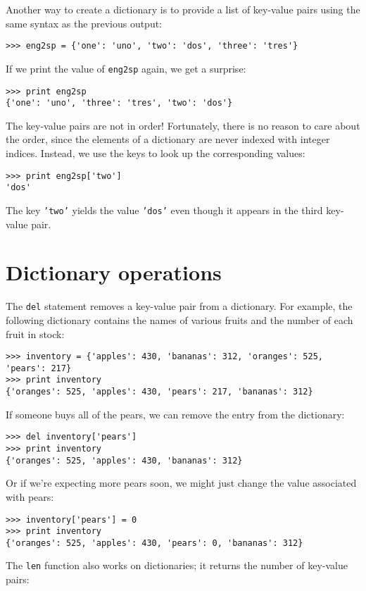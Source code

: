 Another way to create a dictionary is to provide a list of key-value
pairs using the same syntax as the previous output:

\beforeverb
\begin{verbatim}
>>> eng2sp = {'one': 'uno', 'two': 'dos', 'three': 'tres'}
\end{verbatim}
\afterverb
%
If we print the value of {\tt eng2sp} again, we get a surprise:

\beforeverb
\begin{verbatim}
>>> print eng2sp
{'one': 'uno', 'three': 'tres', 'two': 'dos'}
\end{verbatim}
\afterverb
%
The key-value pairs are not in order!  Fortunately, there is no reason
to care about the order, since the elements of a dictionary are never
indexed with integer indices.  Instead, we use the keys to look up the
corresponding values:

\beforeverb
\begin{verbatim}
>>> print eng2sp['two']
'dos'
\end{verbatim}
\afterverb
%
The key {\tt 'two'} yields the value {\tt 'dos'} even though it
appears in the third key-value pair.


\section{Dictionary operations}

The {\tt del} statement removes a key-value pair from a dictionary.
For example, the following dictionary contains the names of various
fruits and the number of each fruit in stock:

\beforeverb
\begin{verbatim}
>>> inventory = {'apples': 430, 'bananas': 312, 'oranges': 525, 
'pears': 217}
>>> print inventory
{'oranges': 525, 'apples': 430, 'pears': 217, 'bananas': 312}
\end{verbatim}
\afterverb
%
If someone buys all of the pears, we can remove the entry from the
dictionary:

\beforeverb
\begin{verbatim}
>>> del inventory['pears']
>>> print inventory
{'oranges': 525, 'apples': 430, 'bananas': 312}
\end{verbatim}
\afterverb
%
Or if we're expecting more pears soon, we might just change the
value associated with pears:

\beforeverb
\begin{verbatim}
>>> inventory['pears'] = 0
>>> print inventory
{'oranges': 525, 'apples': 430, 'pears': 0, 'bananas': 312}
\end{verbatim}
\afterverb
%
The {\tt len} function also works on dictionaries; it returns the
number of key-value pairs:

